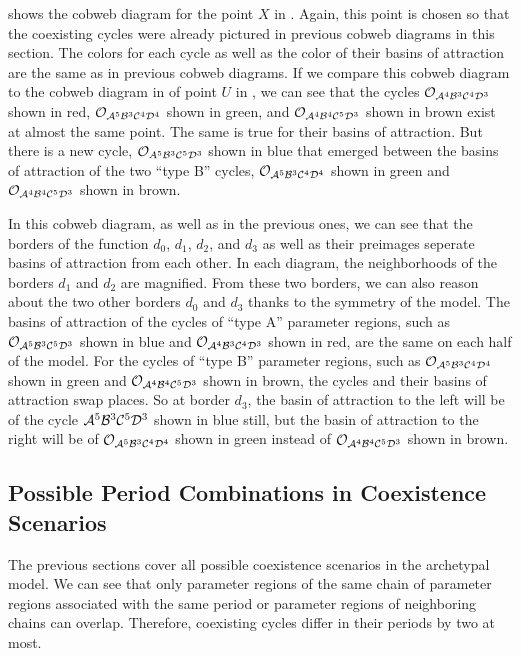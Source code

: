  shows the cobweb diagram for the point $X$ in .
Again, this point is chosen so that the coexisting cycles were already pictured in previous cobweb diagrams in this section.
The colors for each cycle as well as the color of their basins of attraction are the same as in previous cobweb diagrams.
If we compare this cobweb diagram to the cobweb diagram in  of point $U$ in , we can see that the cycles $\mathcal{O}_{\mathcal{A}^4\mathcal{B}^3\mathcal{C}^4\mathcal{D}^3}$ shown in red, $\mathcal{O}_{\mathcal{A}^5\mathcal{B}^3\mathcal{C}^4\mathcal{D}^4}$ shown in green, and $\mathcal{O}_{\mathcal{A}^4\mathcal{B}^4\mathcal{C}^5\mathcal{D}^3}$ shown in brown exist at almost the same point.
The same is true for their basins of attraction.
But there is a new cycle, $\mathcal{O}_{A^5\mathcal{B}^3\mathcal{C}^5\mathcal{D}^3}$ shown in blue that emerged between the basins of attraction of the two ``type B'' cycles, $\mathcal{O}_{\mathcal{A}^5\mathcal{B}^3\mathcal{C}^4\mathcal{D}^4}$ shown in green and $\mathcal{O}_{\mathcal{A}^4\mathcal{B}^4\mathcal{C}^5\mathcal{D}^3}$ shown in brown.

In this cobweb diagram, as well as in the previous ones, we can see that the borders of the function $d_0$, $d_1$, $d_2$, and $d_3$ as well as their preimages seperate basins of attraction from each other.
In each diagram, the neighborhoods of the borders $d_1$ and $d_2$ are magnified.
From these two borders, we can also reason about the two other borders $d_0$ and $d_3$ thanks to the symmetry of the model.
The basins of attraction of the cycles of ``type A'' parameter regions, such as $\mathcal{O}_{\mathcal{A}^5\mathcal{B}^3\mathcal{C}^5\mathcal{D}^3}$ shown in blue and $\mathcal{O}_{\mathcal{A}^4\mathcal{B}^3\mathcal{C}^4\mathcal{D}^3}$ shown in red, are the same on each half of the model.
For the cycles of ``type B'' parameter regions, such as $\mathcal{O}_{\mathcal{A}^5\mathcal{B}^3\mathcal{C}^4\mathcal{D}^4}$ shown in green and $\mathcal{O}_{\mathcal{A}^4\mathcal{B}^4\mathcal{C}^5\mathcal{D}^3}$ shown in brown, the cycles and their basins of attraction swap places.
So at border $d_3$, the basin of attraction to the left will be of the cycle $\mathcal{A}^5\mathcal{B}^3\mathcal{C}^5\mathcal{D}^3$ shown in blue still, but the basin of attraction to the right will be of $\mathcal{O}_{\mathcal{A}^5\mathcal{B}^3\mathcal{C}^4\mathcal{D}^4}$ shown in green instead of $\mathcal{O}_{\mathcal{A}^4\mathcal{B}^4\mathcal{C}^5\mathcal{D}^3}$ shown in brown.

\subsection{Possible Period Combinations in Coexistence Scenarios}

The previous sections cover all possible coexistence scenarios in the archetypal model.
We can see that only parameter regions of the same chain of parameter regions associated with the same period or parameter regions of neighboring chains can overlap.
Therefore, coexisting cycles differ in their periods by two at most.

